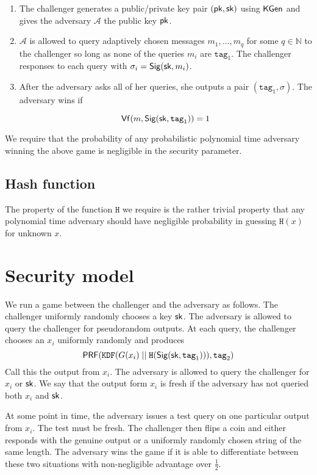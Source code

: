 \documentclass[12pt]{article}
\newcommand{\myconcat}{ \;||\; }
\begin{document}
\begin{enumerate}
\item The challenger generates a public/private key pair $(\mathsf{pk}, \mathsf{sk})$ using $\mathsf{KGen}$ and gives the adversary $\mathcal{A}$ the public key $\mathsf{pk}$.

\item $\mathcal{A}$ is allowed to query adaptively chosen messages $m_1,
	\dots , m_q$ for some $q \in \mathbb{N}$ to the challenger so long as none of the queries $m_i$ are $\texttt{tag}_1$. The
		challenger responses to each query with $\sigma_{i}=
		\mathsf{Sig}{(\mathsf{sk}, m_i})$. 

\item After the adversary asks all of her queries, she outputs a pair $(\texttt{tag}_1, \sigma)$. The adversary wins if 

$$\mathsf{Vf} (m , \mathsf{Sig} ({\mathsf{sk}, \texttt{tag}_1})) = 1$$

\end{enumerate}

We require that the probability of any probabilistic polynomial time adversary winning the above game is negligible in the security parameter.

\subsection{Hash function}
The property of the function $\texttt{H}$ we require is the rather trivial property that any polynomial time adversary should have negligible probability in guessing $\texttt{H}(x)$ for unknown $x$.

\section{Security model}
We run a game between the challenger and the adversary as follows. The challenger uniformly randomly chooses a key $\mathsf{sk}$. The adversary is allowed to query the challenger for pseudorandom outputs. At each query, the challenger chooses an $x_i$ uniformly randomly and produces $$
\prf(\texttt{KDF}(G(x_i) \myconcat \texttt{H}(\sig (\sk, \mathrm{\texttt{tag}_1}))), \texttt{tag}_2 )
$$ Call this the output from $x_i$. The adversary is allowed to query the challenger for $x_i$ or $\mathsf{sk}$. We say that the output form $x_i$ is fresh if the adversary has not queried both $x_i$ and $\mathsf{sk}$.

At some point in time, the adversary issues a test query on one particular output from $x_i$. The test must be fresh. The challenger then flips a coin and either responds with the genuine output or a uniformly randomly chosen string of the same length. The adversary wins the game if it is able to differentiate between these two situations with non-negligible advantage over $\frac{1}{2}$.
\end{document}
